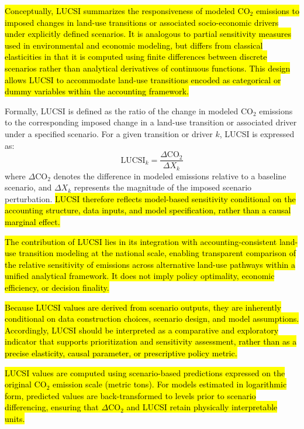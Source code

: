 \documentclass[10pt,letterpaper]{article}
\begin{document}
\hl{Conceptually, LUCSI summarizes the responsiveness of modeled CO$_2$ emissions to imposed changes in land-use transitions or associated socio-economic drivers under explicitly defined scenarios. It is analogous to partial sensitivity measures used in environmental and economic modeling, but differs from classical elasticities in that it is computed using finite differences between discrete scenarios rather than analytical derivatives of continuous functions. This design allows LUCSI to accommodate land-use transitions encoded as categorical or dummy variables within the accounting framework.}

Formally, LUCSI is defined as the ratio of the change in modeled CO$_2$ emissions to the corresponding imposed change in a land-use transition or associated driver under a specified scenario. For a given transition or driver $k$, LUCSI is expressed as:
\begin{equation}
	\text{LUCSI}_k = \frac{\Delta \text{CO}_2}{\Delta X_k}
\end{equation}
where $\Delta \text{CO}_2$ denotes the difference in modeled emissions relative to a baseline scenario, and $\Delta X_k$ represents the magnitude of the imposed scenario perturbation. \hl{LUCSI therefore reflects model-based sensitivity conditional on the accounting structure, data inputs, and model specification, rather than a causal marginal effect.}

\hl{The contribution of LUCSI lies in its integration with accounting-consistent land-use transition modeling at the national scale, enabling transparent comparison of the relative sensitivity of emissions across alternative land-use pathways within a unified analytical framework. It does not imply policy optimality, economic efficiency, or decision finality.}

\hl{Because LUCSI values are derived from scenario outputs, they are inherently conditional on data construction choices, scenario design, and model assumptions. Accordingly, LUCSI should be interpreted as a comparative and exploratory indicator that supports prioritization and sensitivity assessment, rather than as a precise elasticity, causal parameter, or prescriptive policy metric.}

\hl{LUCSI values are computed using scenario-based predictions expressed on the original CO$_2$ emission scale (metric tons). For models estimated in logarithmic form, predicted values are back-transformed to levels prior to scenario differencing, ensuring that $\Delta$CO$_2$ and LUCSI retain physically interpretable units.}
\end{document}
